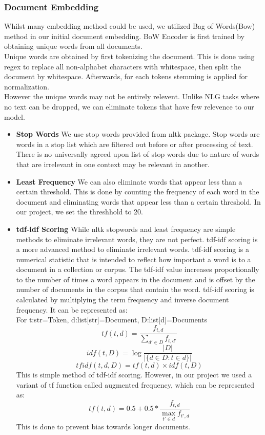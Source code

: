 \documentclass[12pt]{article}
\begin{document}
\subsubsection{Document Embedding}
Whilst many embedding method could be used, we utilized Bag of Words(Bow) method in our initial document embedding. BoW Encoder is first trained by obtaining unique words from all documents.\\
Unique words are obtained by first tokenizing the document. This is done using regex to replace all non-alphabet characters with whitespace, then split the document by whitespace. Afterwards, for each tokens stemming is applied for normalization.\\
However the unique words may not be entirely relevent. Unlike NLG tasks where no text can be dropped, we can eliminate tokens that have few relevence to our model.
\begin{itemize}
    \item \textbf{Stop Words} We use stop words provided from nltk package. Stop words are words in a stop list which are filtered out before or after processing of text. There is no universally agreed upon list of stop words due to nature of words that are irrelevant in one context may be relevant in another.
    \item \textbf{Least Frequency} We can also eliminate words that appear less than a certain threshold. This is done by counting the frequency of each word in the document and eliminating words that appear less than a certain threshold. In our project, we set the threshhold to 20.
    \item \textbf{tdf-idf Scoring} While nltk stopwords and least frequency are simple methods to eliminate irrelevant words, they are not perfect. tdf-idf scoring is a more advanced method to eliminate irrelevant words. tdf-idf scoring is a numerical statistic that is intended to reflect how important a word is to a document in a collection or corpus. The tdf-idf value increases proportionally to the number of times a word appears in the document and is offset by the number of documents in the corpus that contain the word. tdf-idf scoring is calculated by multiplying the term frequency and inverse document frequency. It can be represented as:\\
    For t:str=Token, d:list[str]=Document, D:list[d]=Documents\\
    \[
        tf(t,d) = \frac{f_{t,d}}{\sum_{d' \in D} f_{t,d'}}
    \]
    \[
        idf(t,D) = \log \frac{|D|}{|\{d \in D: t \in d\}|}
    \]
    \[
        tfidf(t,d,D) = tf(t,d) \times idf(t,D)
    \]
    This is simple method of tdf-idf scoring. However, in our project we used a variant of tf function called augmented frequency, which can be represented as:
    \[
        tf(t,d) = 0.5+0.5*\frac{f_{t,d}}{\max_{t' \in d} f_{t',d}}
    \]
    This is done to prevent bias towards longer documents.
\end{itemize}
\end{document}
